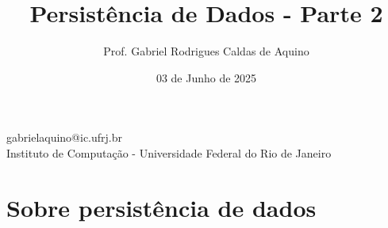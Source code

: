 
\title{Persistência de Dados - Parte 2}

\author{Prof. Gabriel Rodrigues Caldas de Aquino}

\institute
{
    gabrielaquino@ic.ufrj.br\\
    
    Instituto de Computação -
    Universidade Federal do Rio de Janeiro %
}
\date{03 de Junho de 2025} %




\begin{frame}
    \titlepage
\end{frame}

\section{Sobre persistência de dados}





